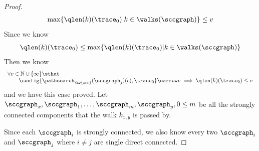 \begin{proof}
\[\begin{array}{l}
      \max\{\qlen(k)(\trace_0) | k \in \walks(\sccgraph)\} \leq v
  \end{array}
    \]
  Since we know
  \[
    \qlen(k)(\trace_0) \leq  \max\{\qlen(k)(\trace_0) | k \in \walks(\sccgraph)\} 
    \]
Then we know
\[
  \begin{array}{l}
    \forall v \in \mathbb{N} \cup \{\infty\} \sthat
    \\ \qquad 
    \config{\pathsearch_{\kw{scc}}(\sccgraph_j)(c), \trace_0} \earrow v
    \implies
  \qlen(k)(\trace_0) \leq v
\end{array}
  \]
  and we have this case proved.
%
%
Let $\sccgraph_x, \sccgraph_1, \ldots, \sccgraph_m, \sccgraph_y, 0 \leq m$ be all the strongly connected components that the walk $k_{x,y}$ is passed by.

Since each $\sccgraph_i$ is strongly connected, 
we also know every two $\sccgraph_i$ and $\sccgraph_j$ where $i\neq j$
are single direct connected. 


\end{proof}
